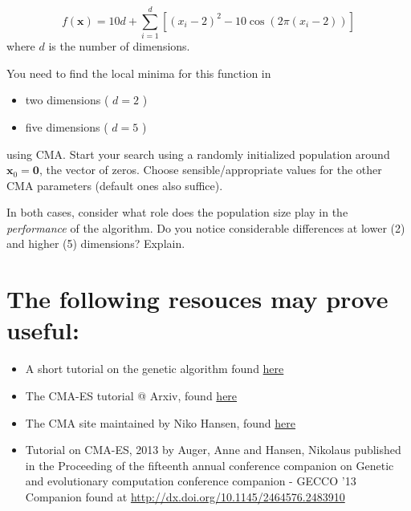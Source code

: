 \documentclass[11pt]{article}
\begin{document}
\begin{equation}
f(\mathbf{x}) = 10d + \sum_{i=1}^{d} \left[ (x_i - 2)^2 - 10 \cos\left(2 \pi (x_i - 2) \right) \right]
\end{equation}
where \(d\) is the number of dimensions.


You need to find the local minima for this function in
\begin{itemize}
\item two dimensions ( \(d = 2\) )
\item five dimensions ( \(d = 5\) )
\end{itemize}
using CMA. Start your search using a randomly initialized population around \(\mathbf{x}_0 = \mathbf{0}\), the vector of zeros. Choose sensible/appropriate values for
the other CMA parameters (default ones also suffice).

In both cases, consider what role does the population size play in the
\emph{performance} of the algorithm. Do you notice considerable differences at lower
(2) and higher (5) dimensions? Explain.

\section{The following resouces may prove useful:}
\label{sec:references}
\begin{itemize}
\item A short tutorial on the genetic algorithm found \href{http://web.cs.ucdavis.edu/\~vemuri/classes/ecs271/Genetic\%2520Algorithms\%2520Short\%2520Tutorial.htm}{here}
\item The CMA-ES tutorial @ Arxiv, found \href{https://arxiv.org/pdf/1604.00772.pdf}{here}
\item The CMA site maintained by Niko Hansen, found \href{http://cma.gforge.inria.fr/index.html}{here}
\item Tutorial on CMA-ES, 2013 by Auger, Anne and Hansen, Nikolaus published in the
Proceeding of the fifteenth annual conference companion on Genetic and
evolutionary computation conference companion - GECCO ’13 Companion found at \url{http://dx.doi.org/10.1145/2464576.2483910}
\end{itemize}
\end{document}
